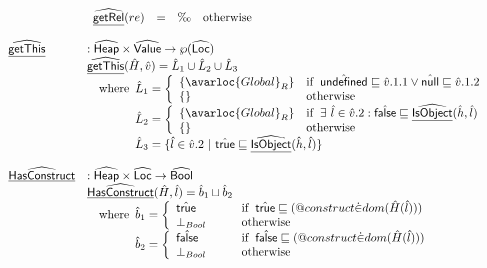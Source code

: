 \[\begin{array}{ll}
& \begin{array}{lll}
  \ahf{getRel}(re) &=& \O \quad\owc
\end{array}
\\\\

\ahf{getThis} & : \aHeap \times \aValue \rightarrow \powerset{\aLoc} \\
& \ahf{getThis}(\hat{H}, \hat{v})
  = \hat{L}_1\cup\hat{L}_2\cup\hat{L}_3\\
& \quad\wherec{
  \hat{L}_1 = \left\{
    \begin{array}{ll}
      \{\avarloc{Global}_R\} & \ifc{\aundef\sqsubseteq\hat{v}.1.1 \vee \anull\sqsubseteq\hat{v}.1.2} \\
      \{\} & \owc \\
    \end{array}
    \right.\\
  \hat{L}_2 = \left\{
    \begin{array}{ll}
      \{\avarloc{Global}_R\} & \ifc{\exists\ \hat{l} \in \hat{v}.2 : \afalse \sqsubseteq \ahf{IsObject}(\hat{h},\hat{l})} \\
      \{\} & \owc \\
    \end{array}
    \right.\\
  \hat{L}_3 = \{ \hat{l} \in \hat{v}.2 ~|~ \atrue \sqsubseteq \ahf{IsObject}(\hat{h},\hat{l}) \} \\
}
\\

\\


\ahf{HasConstruct} & : \aHeap \times \aLoc \rightarrow \abs{Bool} \\
& \ahf{HasConstruct}(\hat{H},\hat{l})
  = \hat{b}_1\sqcup\hat{b}_2 \\
& \quad\wherec{
  \hat{b}_1 = 
    \left\{
      \begin{array}{l@{\quad\quad\quad}l}
        \atrue &\ifc{\atrue\sqsubseteq(\varprop{construct} \dot{\in} dom(\hat{H}(\hat{l})))}\\
        \bot_{Bool} &\owc
      \end{array}
    \right.\\
  \hat{b}_2 = 
    \left\{
      \begin{array}{l@{\quad\quad\quad}l}
        \afalse &\ifc{\afalse\sqsubseteq(\varprop{construct} \dot{\in} dom(\hat{H}(\hat{l})))}\\
        \bot_{Bool} &\owc
      \end{array}
    \right.\\
  }
\\\\


\end{array}\]
